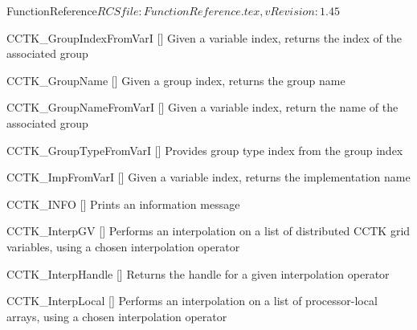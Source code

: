 \begin{cactuspart}{5}{FunctionReference}{$RCSfile: FunctionReference.tex,v $}{$Revision: 1.45 $}
\begin{Lentry}
\item[CCTK\_GroupIndexFromVarI]
  [\pageref{CCTK-GroupIndexFromVarI}]
  Given a variable index, returns the index of the associated group

\item[CCTK\_GroupName]
  [\pageref{CCTK-GroupName}]
  Given a group index, returns the group name

\item[CCTK\_GroupNameFromVarI]
  [\pageref{CCTK-GroupNameFromVarI}]
  Given a variable index, return the name of the associated group

\item[CCTK\_GroupTypeFromVarI]
  [\pageref{CCTK-GroupTypeFromVarI}]
  Provides group type index from the group index

\item[CCTK\_ImpFromVarI]
  [\pageref{CCTK-ImpFromVarI}]
  Given a variable index, returns the implementation name

\item[CCTK\_INFO]
  [\pageref{CCTK-INFO}]
  Prints an information message


\item[CCTK\_InterpGV]
  [\pageref{CCTK-InterpGV}]
  Performs an interpolation on a list of distributed CCTK grid variables,
  using a chosen interpolation operator

\item[CCTK\_InterpHandle]
  [\pageref{CCTK-InterpHandle}]
  Returns the handle for a given interpolation operator

\item[CCTK\_InterpLocal]
  [\pageref{CCTK-InterpLocal}]
  Performs an interpolation on a list of processor-local arrays,
  using a chosen interpolation operator



\end{Lentry}
\end{cactuspart}
